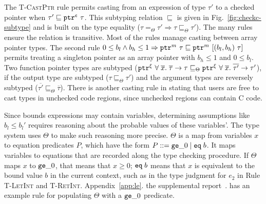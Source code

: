  The \textsc{T-CastPtr} rule
permits casting from an expression of type $\tau'$ to a checked pointer when
$\tau' \sqsubseteq \tptr{\tau}{\cmode}$. This subtyping relation
$\sqsubseteq$ is given in Fig.~\ref{fig:checkc-subtype} and is built on the type equality
($\tau =_{\Theta} \tau'\Rightarrow\tau \sqsubseteq_{\Theta} \tau'$). The many
rules ensure the relation is transitive.  Most of the rules manage
casting between array pointer types. The second rule 
$0\le b_l \wedge b_h \le 1 \Rightarrow \tptr{\tau}{m}\sqsubseteq
\tarrayptr{b_l}{b_h}{\tau}{m}$ permits treating a singleton
pointer as an array pointer with $b_h\le 1$ and $0 \le b_l$.
Two function pointer types are subtyped ($\tptr{\tfun{\overline{x}}{\overline{\tau}}{\tau}}{\xi} \sqsubseteq_{\Theta} \tptr{\tfun{\overline{x}}{\overline{\tau'}}{\tau'}}{\xi}$), 
if the output type are subtyped ($\tau\sqsubseteq_{\Theta}\tau'$) and the argument types are reversely subtyped ($\overline{\tau'}\sqsubseteq_{\Theta}\overline{\tau}$).
There is another casting rule in  stating that
 users are free to cast types in unchecked code regions, since unchecked regions can contain C code.


Since bounds expressions may
contain variables, determining assumptions like $b_l \leq b_l'$
requires reasoning about the probable values of these variables'. The type
system uses $\Theta$ to make such reasoning more precise.
$\Theta$ is a map from variables $x$ to
equation predicates $P$, which have the form $P ::= \tgez \;|\; \teq{b}$.
It maps variables to equations that are recorded along the type checking procedure.
If $\Theta$ maps $x$ to $\tgez$, that means that $x \ge 0$;
$\teq{b}$ means that $x$ is equivalent to the bound value $b$ in the current context, 
such as in the type judgment for $e_2$ in Rule \textsc{T-LetInt} and \textsc{T-RetInt}.
\iftr
  Appendix~\ref{app:le}.
\else
  the supplemental report~\cite{checkedc-tech-report}.
\fi has an example rule for populating $\Theta$ with a $\tgez$ predicate.

